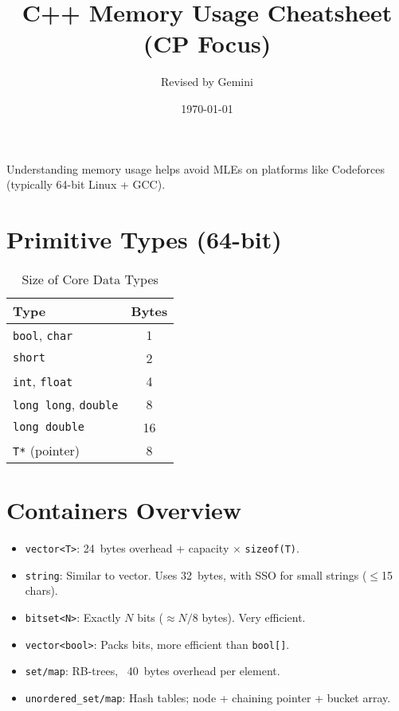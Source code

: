 \documentclass[12pt,a4paper]{article}
\title{C++ Memory Usage Cheatsheet (CP Focus)}
\author{Revised by Gemini}
\date{\today}
\begin{document}
\maketitle

Understanding memory usage helps avoid MLEs on platforms like Codeforces (typically 64-bit Linux + GCC).

\section{Primitive Types (64-bit)}
\begin{table}[htbp]
    \centering
    \caption{Size of Core Data Types}
    \begin{tabular}{lc}
        \toprule
        \textbf{Type} & \textbf{Bytes} \\
        \midrule
        \texttt{bool}, \texttt{char} & 1 \\
        \texttt{short} & 2 \\
        \texttt{int}, \texttt{float} & 4 \\
        \texttt{long long}, \texttt{double} & 8 \\
        \texttt{long double} & 16 \\
        \texttt{T*} (pointer) & 8 \\
        \bottomrule
    \end{tabular}
\end{table}

\section{Containers Overview}
\begin{itemize}
    \item \texttt{vector<T>}: \SI{24}{bytes} overhead + capacity $\times$ \texttt{sizeof(T)}.
    \item \texttt{string}: Similar to vector. Uses \SI{32}{bytes}, with SSO for small strings ($\le$15 chars).
    \item \texttt{bitset<N>}: Exactly $N$ bits ($\approx N/8$ bytes). Very efficient.
    \item \texttt{vector<bool>}: Packs bits, more efficient than \texttt{bool[]}.
    \item \texttt{set/map}: RB-trees, ~\SI{40}{bytes} overhead per element.
    \item \texttt{unordered\_set/map}: Hash tables; node + chaining pointer + bucket array.
\end{itemize}
\end{document}
